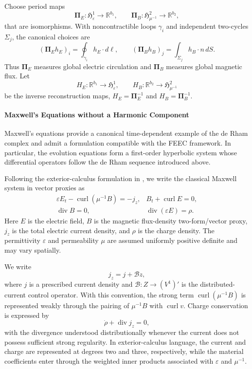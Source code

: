 \documentclass{article}
\DeclareMathOperator{\curl}{curl}
\DeclareMathOperator{\divergence}{div}
\newcommand{\R} {\mathbb R}
\newcommand{\HH}{\mathfrak H}
\newcommand{\Piop}{\boldsymbol\Pi}
\begin{document}
Choose period maps
\begin{equation}
  \Piop_E:\HH^1_{\varepsilon}\longrightarrow\R^{b_1},
  \qquad
  \Piop_B:\HH^2_{\mu^{-1}}\longrightarrow\R^{b_2},
\end{equation}
that are isomorphisms. With noncontractible loops $\gamma_i$ and
independent two-cycles $\Sigma_j$, the canonical choices are
\begin{equation}
  (\Piop_E h_E)_i=\oint_{\gamma_i} h_E\cdot d\ell,
  \qquad
  (\Piop_B h_B)_j=\int_{\Sigma_j} h_B\cdot n\,dS.
\end{equation}
Thus $\Piop_E$ measures global electric circulation and $\Piop_B$
measures global magnetic flux. Let
\[
  H_E:\R^{b_1}\to\HH^1_{\varepsilon},
  \qquad
  H_B:\R^{b_2}\to\HH^2_{\mu^{-1}}
\]
be the inverse reconstruction maps,
$H_E=\Piop_E^{-1}$ and $H_B=\Piop_B^{-1}$.

\paragraph{Maxwell's Equations without a Harmonic Component}

Maxwell's equations provide a canonical time-dependent example of the
de Rham complex and admit a formulation compatible with the FEEC
framework. In particular, the evolution equations form a first-order
hyperbolic system whose differential operators follow the de Rham
sequence introduced above.

Following the exterior-calculus formulation in
\cite[Section~8.6]{arnold2010finite}, we write the classical Maxwell
system in vector proxies as
\[
\begin{array}{ll}
\varepsilon E_t-\curl(\mu^{-1}B)=-j_z,
&
B_t+\curl E=0,
\\[1mm]
\divergence B=0,
&
\divergence(\varepsilon E)=\rho.
\end{array}
\]
Here $E$ is the electric field, $B$ is the magnetic flux-density
two-form/vector proxy, $j_z$ is the total electric current density, and
$\rho$ is the charge density. The permittivity $\varepsilon$ and
permeability $\mu$ are assumed uniformly positive definite and may vary
spatially.

We write
\[
  j_z=j+\mathcal B z,
\]
where $j$ is a prescribed current density and
$\mathcal B:Z\to(V^1)'$ is the distributed-current control operator.
With this convention, the strong term $\curl(\mu^{-1}B)$ is represented
weakly through the pairing of $\mu^{-1}B$ with $\curl v$. Charge
conservation is expressed by
\[
  \dot\rho+\divergence j_z=0,
\]
with the divergence understood distributionally whenever the current
does not possess sufficient strong regularity. In exterior-calculus
language, the current and charge are represented at degrees two and
three, respectively, while the material coefficients enter through the
weighted inner products associated with $\varepsilon$ and $\mu^{-1}$.
\end{document}
